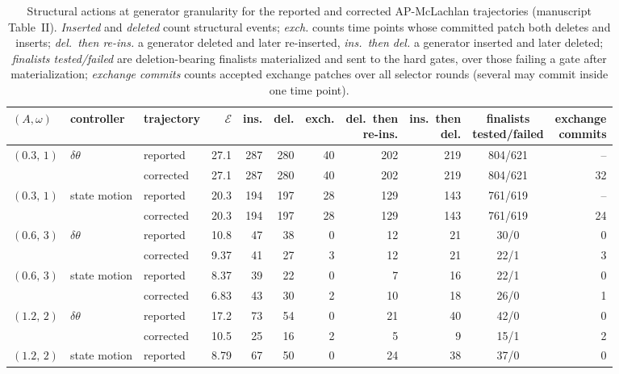 \documentclass[10pt]{article}
\begin{document}
\begin{table}[H]\centering\scriptsize\setlength{\tabcolsep}{3.5pt}
\caption{Structural actions at generator granularity for the reported and corrected AP-McLachlan trajectories (manuscript Table~II).  \emph{Inserted} and \emph{deleted} count structural events; \emph{exch.} counts time points whose committed patch both deletes and inserts; \emph{del.\ then re-ins.} a generator deleted and later re-inserted, \emph{ins.\ then del.} a generator inserted and later deleted; \emph{finalists tested/failed} are deletion-bearing finalists materialized and sent to the hard gates, over those failing a gate after materialization; \emph{exchange commits} counts accepted exchange patches over all selector rounds (several may commit inside one time point).}
\begin{tabular}{lllrrrrrrcr}\toprule
$(A,\omega)$ & controller & trajectory & $\mathcal E$ & ins. & del. & exch. & \shortstack{del.\ then\\re-ins.} & \shortstack{ins.\ then\\del.} & \shortstack{finalists\\tested/failed} & \shortstack{exchange\\commits} \\ \midrule
$(0.3,\,1)$ & $\delta\theta$ & reported & 27.1 & 287 & 280 & 40 & 202 & 219 & 804/621 & -- \\
 &  & corrected & 27.1 & 287 & 280 & 40 & 202 & 219 & 804/621 & 32 \\
\addlinespace[2pt]
$(0.3,\,1)$ & state motion & reported & 20.3 & 194 & 197 & 28 & 129 & 143 & 761/619 & -- \\
 &  & corrected & 20.3 & 194 & 197 & 28 & 129 & 143 & 761/619 & 24 \\
\addlinespace[2pt]
$(0.6,\,3)$ & $\delta\theta$ & reported & 10.8 & 47 & 38 & 0 & 12 & 21 & 30/0 & 0 \\
 &  & corrected & 9.37 & 41 & 27 & 3 & 12 & 21 & 22/1 & 3 \\
\addlinespace[2pt]
$(0.6,\,3)$ & state motion & reported & 8.37 & 39 & 22 & 0 & 7 & 16 & 22/1 & 0 \\
 &  & corrected & 6.83 & 43 & 30 & 2 & 10 & 18 & 26/0 & 1 \\
\addlinespace[2pt]
$(1.2,\,2)$ & $\delta\theta$ & reported & 17.2 & 73 & 54 & 0 & 21 & 40 & 42/0 & 0 \\
 &  & corrected & 10.5 & 25 & 16 & 2 & 5 & 9 & 15/1 & 2 \\
\addlinespace[2pt]
$(1.2,\,2)$ & state motion & reported & 8.79 & 67 & 50 & 0 & 24 & 38 & 37/0 & 0 \\

\end{tabular}
\end{table}
\end{document}
